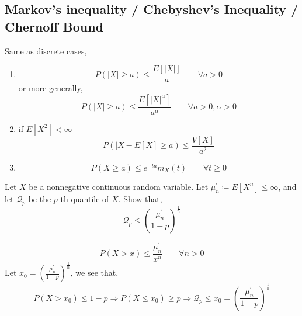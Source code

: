 \subsection{Markov's inequality / Chebyshev's Inequality / Chernoff Bound}
Same as discrete cases,
\begin{enumerate}[noitemsep, topsep=0em]
\item
\[
    P(\vert X \vert \geq a) \leq \frac{E[\vert X \vert]}{a}
    \qquad \forall a > 0
\]
or more generally,
\[
    P(\vert X \vert \geq a) \leq \frac {E[\vert X \vert^\alpha]}{a^\alpha}   
    \qquad \forall a > 0, \alpha > 0
\]
\item if $E[X^2] < \infty$
\[
    P(\vert X - E[X] \geq a) \leq \frac{V[X]}{a^2}
\]
\item
\[
    P(X \geq a) \leq e^{-ta}m_X(t)
    \qquad \forall t \geq 0
\]
\end{enumerate}

\begin{example}
Let $X$ be a nonnegative continuous random variable. Let $\mu_n^\prime
\coloneqq E[X^n] \leq \infty$, and let $\mathcal{Q}_p$ be the $p$-th quantile
of $X$. Show that,
\[
    \mathcal{Q}_p \leq \left(
        \frac{\mu_n^\prime}{1 - p} 
    \right)^{\frac{1}{n}}
\]
\end{example}
\begin{solution}
\[
    P(X > x) \leq \frac{\mu_n^\prime}{x^n} \qquad \forall n > 0
\]
Let $x_0 = \left( \frac{\mu_n^\prime}{1 - p} \right)^{\frac{1}{n}}$, we see
that,
\[
    P(X > x_0) \leq 1 - p
    \Rightarrow
    P(X \leq x_0) \geq p
    \Rightarrow
    \mathcal{Q}_p \leq x_0 = \left( \frac{\mu_n^\prime}{1 - p}
                             \right)^{\frac{1}{n}}
\]
\end{solution}

